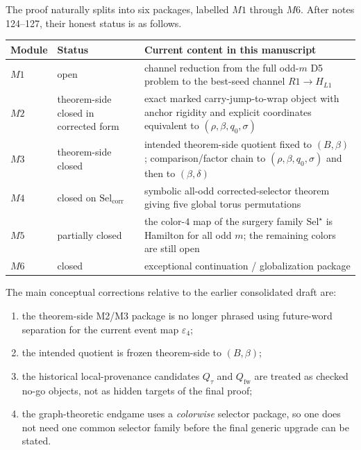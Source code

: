 \documentclass[11pt]{article}
\newcommand{\SelCorr}{\mathrm{Sel}_{\mathrm{corr}}}
\newcommand{\SelStar}{\mathrm{Sel}^{\star}}
\newcommand{\eps}{\varepsilon}
\begin{document}
The proof naturally splits into six packages, labelled $M1$ through $M6$.
After notes 124--127, their honest status is as follows.

\begin{center}
\renewcommand{\arraystretch}{1.15}
\begin{tabularx}{\textwidth}{@{}>{\bfseries}l>{\raggedright\arraybackslash}p{2.6cm}X@{}}
\toprule
Module & Status & Current content in this manuscript \\
\midrule
$M1$ & open & channel reduction from the full odd-$m$ D5 problem to the best-seed channel $R1 \to H_{L1}$ \\
$M2$ & theorem-side closed in corrected form & exact marked carry-jump-to-wrap object with anchor rigidity and explicit coordinates equivalent to $(\rho,\beta,q_0,\sigma)$ \\
$M3$ & theorem-side closed & intended theorem-side quotient fixed to $(B,\beta)$; comparison/factor chain to $(\rho,\beta,q_0,\sigma)$ and then to $(\beta,\delta)$ \\
$M4$ & closed on $\SelCorr$ & symbolic all-odd corrected-selector theorem giving five global torus permutations \\
$M5$ & partially closed & the color-$4$ map of the surgery family $\SelStar$ is Hamilton for all odd $m$; the remaining colors are still open \\
$M6$ & closed & exceptional continuation / globalization package \\
\bottomrule
\end{tabularx}
\end{center}

The main conceptual corrections relative to the earlier consolidated draft are:
\begin{enumerate}[label=\textup{(\alph*)},leftmargin=2.5em]
\item the theorem-side M2/M3 package is no longer phrased using future-word
      separation for the current event map $\eps_4$;
\item the intended quotient is frozen theorem-side to $(B,\beta)$;
\item the historical local-provenance candidates $Q_{\tau}$ and
      $Q_{\mathrm{fw}}$ are treated as checked no-go objects, not as hidden
      targets of the final proof;
\item the graph-theoretic endgame uses a \emph{colorwise} selector package,
      so one does not need one common selector family before the final generic
      upgrade can be stated.
\end{enumerate}
\end{document}
